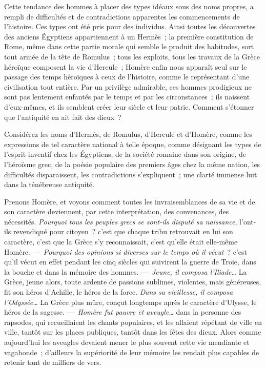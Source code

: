 \documentclass[french,twoside]{book} %
\begin{document}
Cette tendance des hommes à placer des types idéaux sous des noms propres, a rempli de difficultés et de contradictions apparentes les commencements de l’histoire. Ces types ont été pris pour des individus. Ainsi toutes les découvertes des anciens Égyptiens appartiennent à un Hermès ; la  première constitution de Rome, même dans cette partie morale qui semble le produit des habitudes, sort tout armée de la tête de Romulus ; tous les exploits, tous les travaux de la Grèce héroïque composent la vie d’Hercule ; Homère enfin nous apparaît seul sur le passage des temps héroïques à ceux de l’histoire, comme le représentant d’une civilisation tout entière. Par un privilège admirable, ces hommes prodigieux ne sont pas lentement enfantés par le temps et par les circonstances ; ils naissent d’eux-mêmes, et ils semblent créer leur siècle et leur patrie. Comment s’étonner que l’antiquité en ait fait des dieux ?\par
Considérez les noms d’Hermès, de Romulus, d’Hercule et d’Homère, comme les expressions de tel caractère national à telle époque, comme désignant les types de l’esprit inventif chez les Égyptiens, de la société romaine dans son origine, de l’héroïsme grec, de la poésie populaire des premiers âges chez la même nation, les difficultés disparaissent, les contradictions s’expliquent ; une clarté immense luit dans la ténébreuse antiquité.\par
Prenons Homère, et voyons comment toutes les invraisemblances de sa vie et de son caractère deviennent, par cette interprétation, des convenances, des nécessités. {\itshape Pourquoi tous les peuples grecs se sont-ils disputé sa naissance}, l’ont-ils revendiqué  pour citoyen ? c’est que chaque tribu retrouvait en lui son caractère, c’est que la Grèce s’y reconnaissait, c’est qu’elle était elle-même Homère. — {\itshape Pourquoi des opinions si diverses sur le temps où il vécut} ? c’est qu’il vécut en effet pendant les cinq siècles qui suivirent la guerre de Troie, dans la bouche et dans la mémoire des hommes. — {\itshape Jeune, il composa l’Iliade…} La Grèce, jeune alors, toute ardente de passions sublimes, violentes, mais généreuses, fit son héros d’Achille, le héros de la force. {\itshape Dans sa vieillesse, il composa l’Odyssée…} La Grèce plus mûre, conçut longtemps après le caractère d’Ulysse, le héros de la sagesse. — {\itshape Homère fut pauvre et aveugle…} dans la personne des rapsodes, qui recueillaient les chants populaires, et les allaient répétant de ville en ville, tantôt sur les places publiques, tantôt dans les fêtes des dieux. Alors comme aujourd’hui les aveugles devaient mener le plus souvent cette vie mendiante et vagabonde ; d’ailleurs la supériorité de leur mémoire les rendait plus capables de retenir tant de milliers de vers.\par
\end{document}
